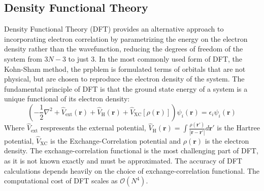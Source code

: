 \subsection{Density Functional Theory}
Density Functional Theory (DFT)\cite{hohenberg1964density,kohn1965self} provides an alternative approach to incorporating electron correlation by parametrizing the energy on the electron density rather than the wavefunction, reducing the degrees of freedom of the system from $3N-3$ to just $3$. In the most commonly used form of DFT, the Kohn-Sham method, the prpblem is formulated terms of orbitals that are not physical, but are chosen to reproduce the electron density of the system. The fundamental principle of DFT is that the ground state energy of a system is a unique functional of its electron density:
\begin{equation}\label{eq:KSDFT}
    \left( -\frac{1}{2} \nabla^2 + \hat{V}_{\mathrm{ext}}(\mathbf{r}) + \hat{V}_\mathrm{H}(\mathbf{r}) + \hat{V}_{\mathrm{XC}}[\rho(\mathbf{r})] \right) \psi_i(\mathbf{r}) = \epsilon_i \psi_i(\mathbf{r})
\end{equation}
Where $\hat{V}_{\mathrm{ext}}$ respresents the external potential, $\hat{V}_\mathrm{H}(\mathbf{r}) = \int \frac{\rho(\mathbf{r}')}{|\mathbf{r} - \mathbf{r}'|} d\mathbf{r}'$ is the Hartree potential, $\hat{V}_{\mathrm{XC}}$ is the Exchange-Correlation potential and $\rho(\mathbf{r})$ is the electron density. The exchange-correlation functional is the most challenging part of DFT, as it is not known exactly and must be approximated. The accuracy of DFT calculations depends heavily on the choice of exchange-correlation functional. The computational cost of DFT scales as $\mathcal{O}(N^4)$.

